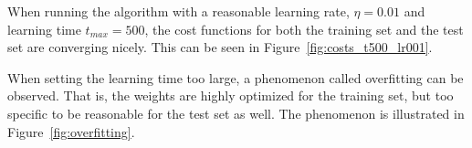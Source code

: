 When running the algorithm with a reasonable learning rate, \(\eta = 0.01\) and learning time \(t_{max} = 500\), the cost functions for both the training set and the test set are converging nicely.
This can be seen in Figure~\ref{fig:costs_t500_lr001}.

When setting the learning time too large, a phenomenon called overfitting can be observed.
That is, the weights are highly optimized for the training set, but too specific to be reasonable for the test set as well.
The phenomenon is illustrated in Figure~\ref{fig:overfitting}.

